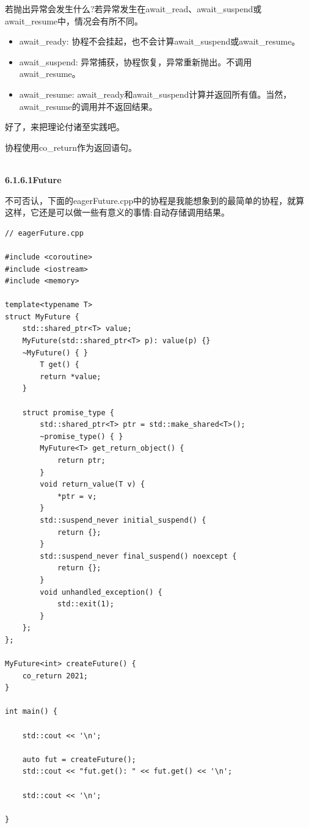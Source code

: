 若抛出异常会发生什么?若异常发生在await\_read、await\_suspend或await\_resume中，情况会有所不同。

\begin{itemize}
\item 
await\_ready: 协程不会挂起，也不会计算await\_suspend或await\_resume。

\item 
await\_suspend: 异常捕获，协程恢复，异常重新抛出。不调用await\_resume。

\item 
await\_resume: await\_ready和await\_suspend计算并返回所有值。当然，await\_resume的调用并不返回结果。
\end{itemize}

好了，来把理论付诸至实践吧。


协程使用co\_return作为返回语句。

\hspace*{\fill} \\ %
\noindent
\textbf{6.1.6.1\hspace{0.2cm}Future}

不可否认，下面的eagerFuture.cpp中的协程是我能想象到的最简单的协程，就算这样，它还是可以做一些有意义的事情:自动存储调用结果。

\begin{lstlisting}[style=styleCXX]
// eagerFuture.cpp

#include <coroutine>
#include <iostream>
#include <memory>

template<typename T>
struct MyFuture {
	std::shared_ptr<T> value;
	MyFuture(std::shared_ptr<T> p): value(p) {}
	~MyFuture() { }
		T get() {
		return *value;
	}

	struct promise_type {
		std::shared_ptr<T> ptr = std::make_shared<T>();
		~promise_type() { }
		MyFuture<T> get_return_object() {
			return ptr;
		}
		void return_value(T v) {
			*ptr = v;
		}
		std::suspend_never initial_suspend() {
			return {};
		}
		std::suspend_never final_suspend() noexcept {
			return {};
		}
		void unhandled_exception() {
			std::exit(1);
		}
	};
};

MyFuture<int> createFuture() {
	co_return 2021;
}

int main() {

	std::cout << '\n';
	
	auto fut = createFuture();
	std::cout << "fut.get(): " << fut.get() << '\n';
	
	std::cout << '\n';

}
\end{lstlisting}

